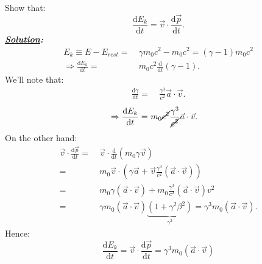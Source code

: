 \documentclass[notitlepage]{report}
\begin{document}
\begin{question}[title = Question 3.1]{}{}
Show that:\\
\[
	\frac{\text{d}E_k}{\text{d}t}=\vec{v}\cdot \frac{\text{d}\vec{p}}{\text{d}t}  
.\] 
\tcblower
\textbf{\emph{\underline{Solution}:}}\\
\begin{align*}
	E_k\equiv E-E_{rest}=&\ \gamma m_0c^2-m_0c^2=\left(\gamma-1\right)m_0c^2 \\
	\Rightarrow \frac{\text{d}E_k}{\text{d}t} =&\ m_0c^2\frac{\text{d}}{\text{d}t}\left(\gamma-1\right)   
.\end{align*}
We'll note that:\\
\begin{align*}
	\frac{\text{d}\gamma}{\text{d}t} =&\ \frac{\gamma^3}{c^2}\vec{a}\cdot \vec{v}
.\end{align*}
\begin{align*}
	\Rightarrow \frac{\text{d}E_k}{\text{d}t} =&\ m_0\cancel{c^2}\frac{\gamma^3}{\cancel{c^2}}\vec{a}\cdot \vec{v}
.\end{align*}
On the other hand:\\
\begin{align*}
	\vec{v}\cdot \frac{\text{d}\vec{p}}{\text{d}t} =&\ \vec{v}\cdot \frac{\text{d}}{\text{d}t}\left(m_0\gamma \vec{v}\right)\\
	 =&\ m_0 \vec{v}\cdot\left(\gamma \vec{a}+ \vec{v} \frac{\gamma^3}{c^2}\left(\vec{a} \cdot \vec{v}\right) \right)\\
	  =&\ m_0\gamma\left(\vec{a}\cdot \vec{v}\right)+m_0 \frac{\gamma^3}{c^2}\left(\vec{a}\cdot \vec{v}\right)v^2\\
		=&\ \gamma m_0\left(\vec{a}\cdot \vec{v}\right)\underbrace{\left(1+\gamma^2\beta^2\right)}_{\gamma^2}=\gamma^3m_0\left(\vec{a}\cdot \vec{v}\right)   
.\end{align*}
Hence:\\
\begin{equation}
	\frac{\text{d}E_k}{\text{d}t}=\vec{v}\cdot \frac{\text{d}\vec{p}}{\text{d}t}=\gamma^3m_0\left(\vec{a}\cdot \vec{v}\right)\label{eq1}
\end{equation}
\end{question}
\end{document}
